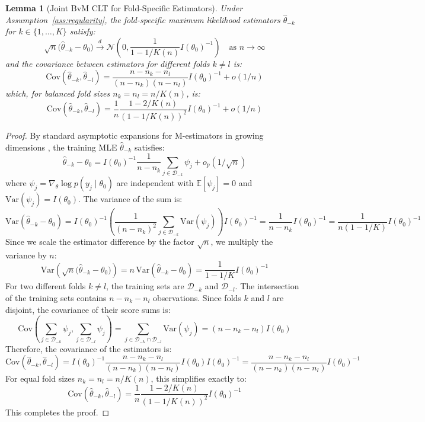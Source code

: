\documentclass[12pt]{article}
\newtheorem{lemma}{Lemma}
\begin{document}
\begin{lemma}[Joint BvM CLT for Fold-Specific Estimators]\label{lem:joint_bvm}
Under Assumption~\ref{ass:regularity}, the fold-specific maximum likelihood estimators $\hat{\theta}_{-k}$ for $k \in \{1, \dots, K\}$ satisfy:
\[
\sqrt{n}\big(\hat{\theta}_{-k} - \theta_0\big) \xrightarrow{d} \mathcal{N}\left( 0, \frac{1}{1 - 1/K(n)} I(\theta_0)^{-1} \right) \quad \text{as } n \to \infty
\]
and the covariance between estimators for different folds $k \neq l$ is:
\begin{equation}
\text{Cov}\left( \hat{\theta}_{-k}, \hat{\theta}_{-l} \right) = \frac{n - n_k - n_l}{(n - n_k)(n - n_l)} I(\theta_0)^{-1} + o(1/n)
\end{equation}
which, for balanced fold sizes $n_k = n_l = n/K(n)$, is:
\begin{equation}
\text{Cov}\left( \hat{\theta}_{-k}, \hat{\theta}_{-l} \right) = \frac{1}{n} \frac{1 - 2/K(n)}{(1 - 1/K(n))^2} I(\theta_0)^{-1} + o(1/n)
\end{equation}
\end{lemma}

\begin{proof}
By standard asymptotic expansions for M-estimators in growing dimensions \cite{vdv1998asymptotic}, the training MLE $\hat{\theta}_{-k}$ satisfies:
\[
\hat{\theta}_{-k} - \theta_0 = I(\theta_0)^{-1} \frac{1}{n - n_k} \sum_{j \in \mathcal{D}_{-k}} \psi_j + o_p(1/\sqrt{n})
\]
where $\psi_j = \nabla_\theta \log p(y_j \mid \theta_0)$ are independent with $\mathbb{E}[\psi_j] = 0$ and $\text{Var}(\psi_j) = I(\theta_0)$.
The variance of the sum is:
\[
\text{Var}\left( \hat{\theta}_{-k} - \theta_0 \right) = I(\theta_0)^{-1} \left( \frac{1}{(n - n_k)^2} \sum_{j \in \mathcal{D}_{-k}} \text{Var}(\psi_j) \right) I(\theta_0)^{-1} = \frac{1}{n - n_k} I(\theta_0)^{-1} = \frac{1}{n(1 - 1/K)} I(\theta_0)^{-1}
\]
Since we scale the estimator difference by the factor $\sqrt{n}$, we multiply the variance by $n$:
\[
\text{Var}\left( \sqrt{n}\big(\hat{\theta}_{-k} - \theta_0\big) \right) = n \, \text{Var}\left( \hat{\theta}_{-k} - \theta_0 \right) = \frac{1}{1 - 1/K} I(\theta_0)^{-1}
\]
For two different folds $k \neq l$, the training sets are $\mathcal{D}_{-k}$ and $\mathcal{D}_{-l}$. The intersection of the training sets contains $n - n_k - n_l$ observations. Since folds $k$ and $l$ are disjoint, the covariance of their score sums is:
\[
\text{Cov}\left( \sum_{j \in \mathcal{D}_{-k}} \psi_j, \sum_{j \in \mathcal{D}_{-l}} \psi_j \right) = \sum_{j \in \mathcal{D}_{-k} \cap \mathcal{D}_{-l}} \text{Var}(\psi_j) = (n - n_k - n_l) I(\theta_0)
\]
Therefore, the covariance of the estimators is:
\[
\text{Cov}\left( \hat{\theta}_{-k}, \hat{\theta}_{-l} \right) = I(\theta_0)^{-1} \frac{n - n_k - n_l}{(n - n_k)(n - n_l)} I(\theta_0) I(\theta_0)^{-1} = \frac{n - n_k - n_l}{(n - n_k)(n - n_l)} I(\theta_0)^{-1}
\]
For equal fold sizes $n_k = n_l = n/K(n)$, this simplifies exactly to:
\[
\text{Cov}\left( \hat{\theta}_{-k}, \hat{\theta}_{-l} \right) = \frac{1}{n} \frac{1 - 2/K(n)}{(1 - 1/K(n))^2} I(\theta_0)^{-1}
\]
This completes the proof.
\end{proof}
\end{document}
